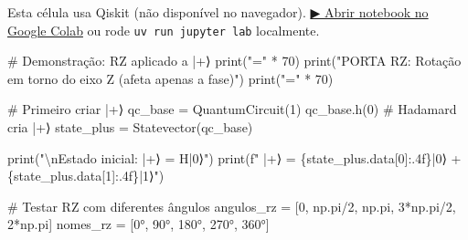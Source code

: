 \documentclass[
  brazilian,
]{report}
\newenvironment{Shaded}{\begin{snugshade}}{\end{snugshade}}
\newcommand{\BuiltInTok}[1]{\textcolor[rgb]{0.00,0.23,0.31}{#1}}
\newcommand{\CharTok}[1]{\textcolor[rgb]{0.13,0.47,0.30}{#1}}
\newcommand{\CommentTok}[1]{\textcolor[rgb]{0.37,0.37,0.37}{#1}}
\newcommand{\DecValTok}[1]{\textcolor[rgb]{0.68,0.00,0.00}{#1}}
\newcommand{\NormalTok}[1]{\textcolor[rgb]{0.00,0.23,0.31}{#1}}
\newcommand{\OperatorTok}[1]{\textcolor[rgb]{0.37,0.37,0.37}{#1}}
\newcommand{\SpecialCharTok}[1]{\textcolor[rgb]{0.37,0.37,0.37}{#1}}
\newcommand{\SpecialStringTok}[1]{\textcolor[rgb]{0.13,0.47,0.30}{#1}}
\newcommand{\StringTok}[1]{\textcolor[rgb]{0.13,0.47,0.30}{#1}}
\begin{document}
\begin{tcolorbox}[enhanced jigsaw, arc=.35mm, bottomrule=.15mm, bottomtitle=1mm, breakable, colback=white, colbacktitle=quarto-callout-warning-color!10!white, colframe=quarto-callout-warning-color-frame, coltitle=black, left=2mm, leftrule=.75mm, opacityback=0, opacitybacktitle=0.6, rightrule=.15mm, title=\textcolor{quarto-callout-warning-color}{\faExclamationTriangle}\hspace{0.5em}{⚛️ Célula Qiskit --- execute no Colab ou localmente}, titlerule=0mm, toprule=.15mm, toptitle=1mm]

Esta célula usa Qiskit (não disponível no navegador).
\href{https://colab.research.google.com/github/maxwellamaral/aula-quantum/blob/main/notebooks/00b-phases.ipynb}{▶
Abrir notebook no Google Colab} ou rode \texttt{uv\ run\ jupyter\ lab}
localmente.

\begin{Shaded}
\begin{Highlighting}[]

\CommentTok{\# Demonstração: RZ aplicado a |+⟩}
\BuiltInTok{print}\NormalTok{(}\StringTok{"="} \OperatorTok{*} \DecValTok{70}\NormalTok{)}
\BuiltInTok{print}\NormalTok{(}\StringTok{"PORTA RZ: Rotação em torno do eixo Z (afeta apenas a fase)"}\NormalTok{)}
\BuiltInTok{print}\NormalTok{(}\StringTok{"="} \OperatorTok{*} \DecValTok{70}\NormalTok{)}

\CommentTok{\# Primeiro criar |+⟩}
\NormalTok{qc\_base }\OperatorTok{=}\NormalTok{ QuantumCircuit(}\DecValTok{1}\NormalTok{)}
\NormalTok{qc\_base.h(}\DecValTok{0}\NormalTok{)  }\CommentTok{\# Hadamard cria |+⟩}
\NormalTok{state\_plus }\OperatorTok{=}\NormalTok{ Statevector(qc\_base)}

\BuiltInTok{print}\NormalTok{(}\StringTok{"}\CharTok{\textbackslash{}n}\StringTok{Estado inicial: |+⟩ = H|0⟩"}\NormalTok{)}
\BuiltInTok{print}\NormalTok{(}\SpecialStringTok{f"  |+⟩ = }\SpecialCharTok{\{}\NormalTok{state\_plus}\SpecialCharTok{.}\NormalTok{data[}\DecValTok{0}\NormalTok{]}\SpecialCharTok{:.4f\}}\SpecialStringTok{|0⟩ + }\SpecialCharTok{\{}\NormalTok{state\_plus}\SpecialCharTok{.}\NormalTok{data[}\DecValTok{1}\NormalTok{]}\SpecialCharTok{:.4f\}}\SpecialStringTok{|1⟩"}\NormalTok{)}

\CommentTok{\# Testar RZ com diferentes ângulos}
\NormalTok{angulos\_rz }\OperatorTok{=}\NormalTok{ [}\DecValTok{0}\NormalTok{, np.pi}\OperatorTok{/}\DecValTok{2}\NormalTok{, np.pi, }\DecValTok{3}\OperatorTok{*}\NormalTok{np.pi}\OperatorTok{/}\DecValTok{2}\NormalTok{, }\DecValTok{2}\OperatorTok{*}\NormalTok{np.pi]}
\NormalTok{nomes\_rz }\OperatorTok{=}\NormalTok{ [}\StringTok{\textquotesingle{}0°\textquotesingle{}}\NormalTok{, }\StringTok{\textquotesingle{}90°\textquotesingle{}}\NormalTok{, }\StringTok{\textquotesingle{}180°\textquotesingle{}}\NormalTok{, }\StringTok{\textquotesingle{}270°\textquotesingle{}}\NormalTok{, }\StringTok{\textquotesingle{}360°\textquotesingle{}}\NormalTok{]}


\end{Highlighting}
\end{Shaded}
\end{tcolorbox}
\end{document}
